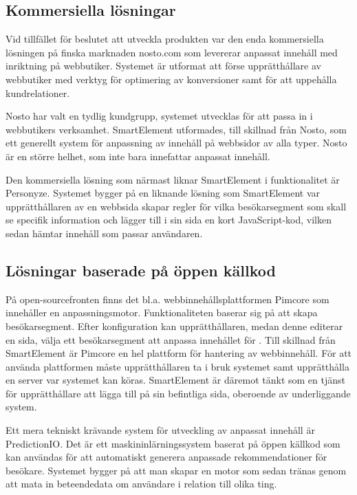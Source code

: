 \subsection{Kommersiella lösningar}

Vid tillfället för beslutet att utveckla produkten var den enda kommersiella lösningen på finska marknaden nosto.com som levererar anpassat innehåll med inriktning på webbutiker. Systemet är utformat att förse upprätthållare av webbutiker med verktyg för optimering av konversioner samt för att uppehålla kundrelationer. \citep{nosto}

Nosto har valt en tydlig kundgrupp, systemet utvecklas för att passa in i webbutikers verksamhet. SmartElement utformades, till skillnad från Nosto, som ett generellt system för anpassning av innehåll på webbsidor av alla typer. Nosto är en större helhet, som inte bara innefattar anpassat innehåll.

Den kommersiella lösning som närmast liknar SmartElement i funktionalitet är Personyze. Systemet bygger på en liknande lösning som SmartElement var upprätthållaren av en webbsida skapar regler för vilka besökarsegment som skall se specifik information och lägger till i sin sida en kort JavaScript-kod, vilken sedan hämtar innehåll som passar användaren. \citep{personyze}

\subsection{Lösningar baserade på öppen källkod}

På open-sourcefronten finns det bl.a. webbinnehållsplattformen Pimcore som innehåller en anpassningsmotor. Funktionaliteten baserar sig på att skapa besökarsegment. Efter konfiguration kan upprätthållaren, medan denne editerar en sida, välja ett besökarsegment att anpassa innehållet för \citep{pimcore}.
Till skillnad från SmartElement är Pimcore en hel plattform för hantering av webbinnehåll. För att använda plattformen måste upprätthållaren ta i bruk systemet samt upprätthålla en server var systemet kan köras. SmartElement är däremot tänkt som en tjänst för upprätthållare att lägga till på sin befintliga sida, oberoende av underliggande system.

Ett mera tekniskt krävande system för utveckling av anpassat innehåll är PredictionIO. Det är ett maskininlärningssystem baserat på öppen källkod som kan användas för att automatiskt generera anpassade rekommendationer för besökare. Systemet bygger på att man skapar en motor som sedan tränas genom att mata in beteendedata om användare i relation till olika ting. \citep{predicionioconcepts}


